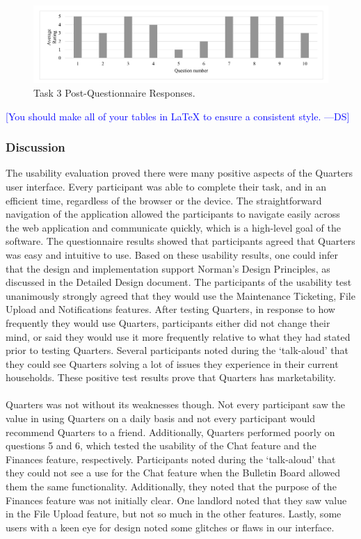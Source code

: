 \documentclass[12pt]{article}
\newcommand{\authornote}[3]{\textcolor{#1}{[#3 ---#2]}}
\newcommand{\authornote}[3]{}
\newcommand{\ds}[1]{\authornote{blue}{DS}{#1}}
\begin{document}
\begin{figure}[h]
    \centering
    \includegraphics[width=1\textwidth]{figures/task3.png}
    \caption{Task 3 Post-Questionnaire Responses.}
    \label{fig:task3}
\end{figure}

\ds{You should make all of your tables in \LaTeX{} to ensure a consistent style.}

\subsubsection{Discussion}
The usability evaluation proved there were many positive aspects of the Quarters user interface. Every participant was able to complete their task, and in an efficient time, regardless of the browser or the device. The straightforward navigation of the application allowed the participants to navigate easily across the web application and communicate quickly, which is a high-level goal of the software. The questionnaire results showed that participants agreed that Quarters was easy and intuitive to use. Based on these usability results, one could infer that the design and implementation support Norman’s Design Principles, as discussed in the Detailed Design document. The participants of the usability test unanimously strongly agreed that they would use the Maintenance Ticketing, File Upload and Notifications features. After testing Quarters, in response to how frequently they would use Quarters, participants either did not change their mind, or said they would use it more frequently relative to what they had stated prior to testing Quarters. Several participants noted during the ‘talk-aloud’ that they could see Quarters solving a lot of issues they experience in their current households. These positive test results prove that Quarters has marketability. \\ \\
Quarters was not without its weaknesses though. Not every participant saw the value in using Quarters on a daily basis and not every participant would recommend Quarters to a friend. Additionally, Quarters performed poorly on questions 5 and 6, which tested the usability of the Chat feature and the Finances feature, respectively. Participants noted during the ‘talk-aloud’ that they could not see a use for the Chat feature when the Bulletin Board allowed them the same functionality. Additionally, they noted that the purpose of the Finances feature was not initially clear. One landlord noted that they saw value in the File Upload feature, but not so much in the other features. Lastly, some users with a keen eye for design noted some glitches or flaws in our interface. \\
\end{document}
